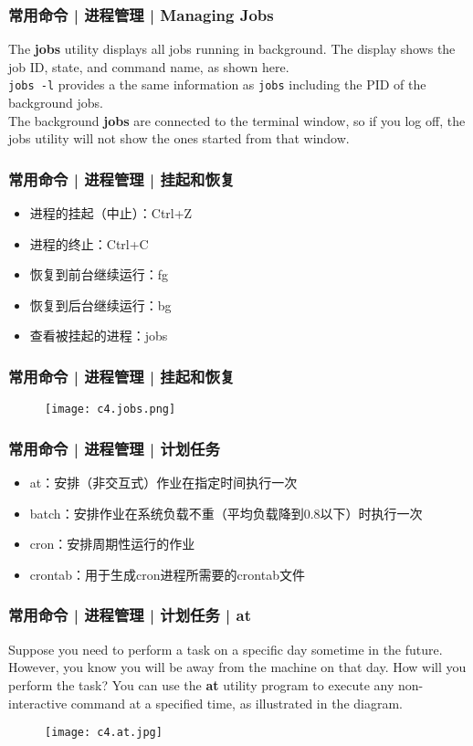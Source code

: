 \begin{frame}[fragile]
  \frametitle{常用命令 | 进程管理 | Managing Jobs}
  The \textbf{jobs} utility displays all jobs running in background. The display shows the job ID, state, and command name, as shown here.\\
  \vspace{0.2cm}
  \verb|jobs -l| provides a the same information as \verb|jobs| including the PID of the background jobs.\\
  \vspace{0.2cm}
  The background \textbf{jobs} are connected to the terminal window, so if you log off, the jobs utility will not show the ones started from that window.
\end{frame}

\begin{frame}
  \frametitle{常用命令 | 进程管理 | \alert{挂起和恢复}}
  \begin{itemize}
    \item 进程的挂起（中止）：Ctrl+Z
    \item 进程的终止：Ctrl+C
    \item 恢复到前台继续运行：fg
    \item 恢复到后台继续运行：bg
    \item 查看被挂起的进程：jobs
  \end{itemize}
\end{frame}

\begin{frame}
  \frametitle{常用命令 | 进程管理 | 挂起和恢复}
  \begin{figure}
    \centering
    \texttt{[image: c4.jobs.png]}
  \end{figure}
\end{frame}

\begin{frame}
  \frametitle{常用命令 | 进程管理 | \alert{计划任务}}
  \begin{itemize}
    \item at：安排（非交互式）作业在指定时间执行一次
    \item batch：安排作业在系统负载不重（平均负载降到0.8以下）时执行一次
    \item cron：安排周期性运行的作业
    \item crontab：用于生成cron进程所需要的crontab文件
  \end{itemize}
\end{frame}

\begin{frame}
  \frametitle{常用命令 | 进程管理 | 计划任务 | at}
  Suppose you need to perform a task on a specific day sometime in the future. However, you know you will be away from the machine on that day. How will you perform the task? You can use the \textbf{at} utility program to execute any non-interactive command at a specified time, as illustrated in the diagram.
  \begin{figure}
    \centering
    \texttt{[image: c4.at.jpg]}
  \end{figure}
\end{frame}

